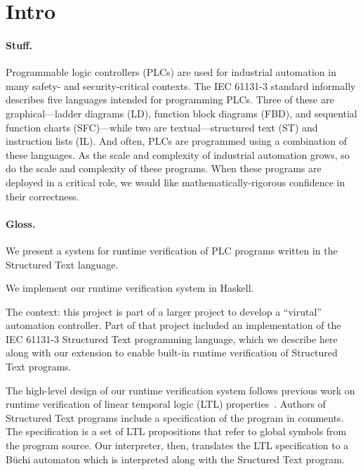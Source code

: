 % 

\section{Intro}

\paragraph{Stuff.}

Programmable logic controllers (PLCs) are used for industrial automation in many
safety- and security-critical contexts. The IEC 61131-3 standard informally
describes five languages intended for programming PLCs. Three of these are
graphical---ladder diagrams (LD), function block diagrams (FBD), and sequential
function charts (SFC)---while two are textual---structured text (ST) and
instruction lists (IL). And often, PLCs are programmed using a combination of
these languages. As the scale and complexity of industrial automation grows, so
do the scale and complexity of these programs. When these programs are deployed
in a critical role, we would like mathematically-rigorous confidence in their
correctness.

\paragraph{Gloss.}

We present a system for runtime verification of PLC programs written in the
Structured Text language.

We implement our runtime verification system in Haskell.

The context: this project is part of a larger project to develop a ``virutal''
automation controller. Part of that project included an implementation of the
IEC 61131-3 Structured Text programming language, which we describe here along
with our extension to enable built-in runtime verification of Structured Text
programs.

The high-level design of our runtime verification system follows previous work
on runtime verification of linear temporal logic (LTL)
properties~\cite{bauer:rv_ltl}. Authors of Structured Text programs include a
specification of the program in comments. The specification is a set of LTL
propositions that refer to global symbols from the program source. Our
interpreter, then, translates the LTL specification to a B\"uchi automaton which
is interpreted along with the Sructured Text program.

